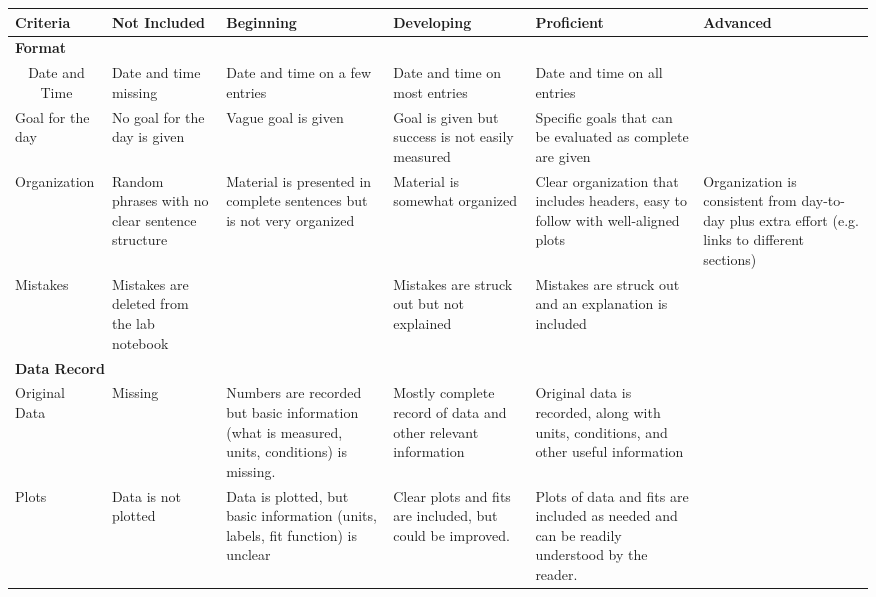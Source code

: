 \documentclass[10pt, letterpaper]{article}
\begin{document}
\begin{landscape}
        \begin{tabular}{|p{2cm}|p{4cm}|p{4.5cm}| p{5cm}|p{5.4cm}| p{3.5cm}|}\hline
            \textbf{Criteria} & \textbf{Not Included} & \textbf{Beginning} & \textbf{Developing} & \textbf{Proficient} & \textbf{Advanced} \\ \hline
            
            \multicolumn{6}{|l|}{\textbf{Format}}\\ \hline
            
            \multicolumn{1}{|c|}{Date and Time} & Date and time missing & Date and time on a few entries & Date and time on most entries & Date and time on all entries &   \\ \hline

            Goal for the day & No goal for the day is given & Vague goal is given & Goal is given but success is not easily measured & Specific goals that can be evaluated as complete are given & \\ \hline
            
            Organization & Random phrases with no clear sentence structure & Material is presented in complete sentences but is not very organized & Material is somewhat organized & Clear organization that includes headers, easy to follow with well-aligned plots & Organization is consistent from day-to-day plus extra effort (e.g. links to different sections) \\ \hline

            Mistakes & Mistakes are deleted from the lab notebook & & Mistakes are struck out but not explained & Mistakes are struck out and an explanation is included & \\ \hline
            
            \multicolumn{6}{|l|}{\textbf{Data Record}}\\ \hline

            \multicolumn{1}{|p{2cm}|}{Original Data} & Missing & Numbers are recorded but basic information (what   is measured, units, conditions) is missing. & Mostly complete record of data and other relevant information & Original data is recorded, along with units, conditions, and other useful information & \\ \hline

            Plots & Data is not plotted & Data  is  plotted, but basic information (units, labels, fit function) is unclear &Clear plots and fits are included, but could be improved. & Plots of data and fits are included as needed and can be readily understood by the reader. & \\ \hline


\end{tabular}
\end{landscape}
\end{document}
